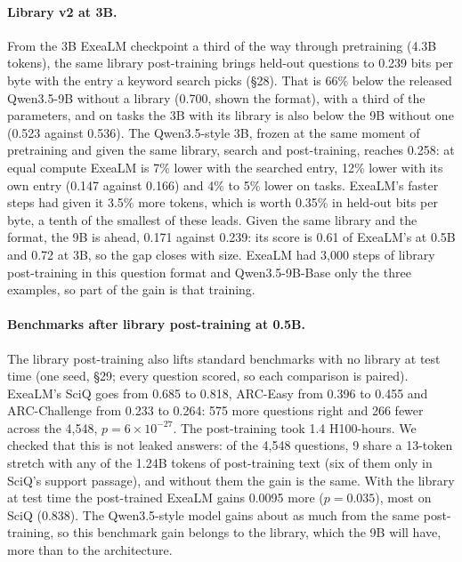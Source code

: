 \documentclass[11pt,letterpaper]{article}
\newcommand{\sect}[1]{\S#1}
\begin{document}
\paragraph{Library v2 at 3B.}
From the 3B ExeaLM checkpoint a third of the way through pretraining (4.3B tokens), the same library post-training brings held-out questions to 0.239 bits per byte with the entry a keyword search picks (\sect{28}).
That is 66\% below the released Qwen3.5-9B without a library (0.700, shown the format), with a third of the parameters, and on tasks the 3B with its library is also below the 9B without one (0.523 against 0.536).
The Qwen3.5-style 3B, frozen at the same moment of pretraining and given the same library, search and post-training, reaches 0.258: at equal compute ExeaLM is 7\% lower with the searched entry, 12\% lower with its own entry (0.147 against 0.166) and 4\% to 5\% lower on tasks. ExeaLM's faster steps had given it 3.5\% more tokens, which is worth 0.35\% in held-out bits per byte, a tenth of the smallest of these leads.
Given the same library and the format, the 9B is ahead, 0.171 against 0.239: its score is 0.61 of ExeaLM's at 0.5B and 0.72 at 3B, so the gap closes with size.
ExeaLM had 3,000 steps of library post-training in this question format and Qwen3.5-9B-Base only the three examples, so part of the gain is that training.

\paragraph{Benchmarks after library post-training at 0.5B.}
The library post-training also lifts standard benchmarks with no library at test time (one seed, \sect{29}; every question scored, so each comparison is paired).
ExeaLM's SciQ goes from 0.685 to 0.818, ARC-Easy from 0.396 to 0.455 and ARC-Challenge from 0.233 to 0.264: 575 more questions right and 266 fewer across the 4,548, $p = 6\times10^{-27}$.
The post-training took 1.4 H100-hours.
We checked that this is not leaked answers: of the 4,548 questions, 9 share a 13-token stretch with any of the 1.24B tokens of post-training text (six of them only in SciQ's support passage), and without them the gain is the same.
With the library at test time the post-trained ExeaLM gains 0.0095 more ($p = 0.035$), most on SciQ (0.838).
The Qwen3.5-style model gains about as much from the same post-training, so this benchmark gain belongs to the library, which the 9B will have, more than to the architecture.
\end{document}
